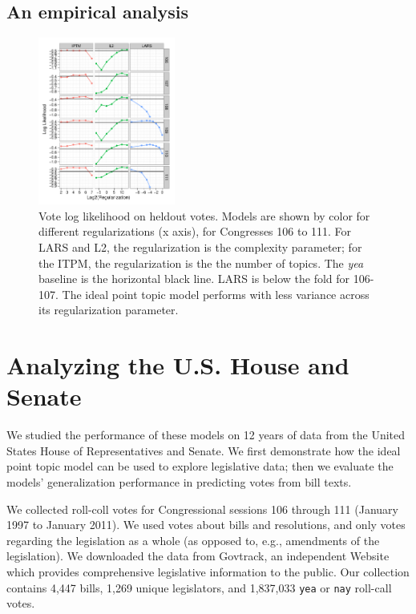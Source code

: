 \subsection{An empirical analysis}

\begin{figure}
\label{fig:log_likelihood}
\begin{center}
  \includegraphics[width=0.40\textwidth]
{chapter_spatial_voting_with_text/figures/138_log_likelihood_by_session_topics.pdf}
\end{center}
\vspace{-6pt}
\caption{Vote log likelihood on heldout votes. Models are shown
  by color for different regularizations (x axis), for Congresses 106
  to 111.  For LARS and L2, the regularization is the complexity
  parameter; for the ITPM, the regularization is the the number of
  topics.  The \emph{yea} baseline is the horizontal black line. LARS
  is below the fold for 106-107.  The ideal point topic model performs
  with less variance across its regularization parameter. }
\vspace{-3pt}
\end{figure}
\section{Analyzing the U.S. House and Senate}
\label{sec:experiments}

We studied the performance of these models on 12 years of data from
the United States House of Representatives and Senate.  We first
demonstrate how the ideal point topic model can be used to explore
legislative data; then we evaluate the models' generalization
performance in predicting votes from bill texts.

We collected roll-coll votes for Congressional sessions 106 through
111 (January 1997 to January 2011).  We used votes about bills and
resolutions, and only votes regarding the legislation as a whole
(as opposed to, e.g., amendments of the legislation). We downloaded
the data from Govtrack, an independent Website which provides
comprehensive legislative information to the public.  Our
collection contains 4,447 bills, 1,269 unique legislators, and
1,837,033 \verb!yea! or \verb!nay! roll-call votes.


